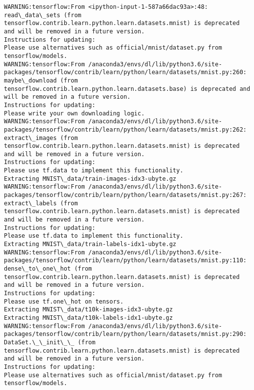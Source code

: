 \documentclass[11pt]{article}
\begin{document}
    \begin{Verbatim}[commandchars=\\\{\}]
WARNING:tensorflow:From <ipython-input-1-587a66dac93a>:48: read\_data\_sets (from tensorflow.contrib.learn.python.learn.datasets.mnist) is deprecated and will be removed in a future version.
Instructions for updating:
Please use alternatives such as official/mnist/dataset.py from tensorflow/models.
WARNING:tensorflow:From /anaconda3/envs/dl/lib/python3.6/site-packages/tensorflow/contrib/learn/python/learn/datasets/mnist.py:260: maybe\_download (from tensorflow.contrib.learn.python.learn.datasets.base) is deprecated and will be removed in a future version.
Instructions for updating:
Please write your own downloading logic.
WARNING:tensorflow:From /anaconda3/envs/dl/lib/python3.6/site-packages/tensorflow/contrib/learn/python/learn/datasets/mnist.py:262: extract\_images (from tensorflow.contrib.learn.python.learn.datasets.mnist) is deprecated and will be removed in a future version.
Instructions for updating:
Please use tf.data to implement this functionality.
Extracting MNIST\_data/train-images-idx3-ubyte.gz
WARNING:tensorflow:From /anaconda3/envs/dl/lib/python3.6/site-packages/tensorflow/contrib/learn/python/learn/datasets/mnist.py:267: extract\_labels (from tensorflow.contrib.learn.python.learn.datasets.mnist) is deprecated and will be removed in a future version.
Instructions for updating:
Please use tf.data to implement this functionality.
Extracting MNIST\_data/train-labels-idx1-ubyte.gz
WARNING:tensorflow:From /anaconda3/envs/dl/lib/python3.6/site-packages/tensorflow/contrib/learn/python/learn/datasets/mnist.py:110: dense\_to\_one\_hot (from tensorflow.contrib.learn.python.learn.datasets.mnist) is deprecated and will be removed in a future version.
Instructions for updating:
Please use tf.one\_hot on tensors.
Extracting MNIST\_data/t10k-images-idx3-ubyte.gz
Extracting MNIST\_data/t10k-labels-idx1-ubyte.gz
WARNING:tensorflow:From /anaconda3/envs/dl/lib/python3.6/site-packages/tensorflow/contrib/learn/python/learn/datasets/mnist.py:290: DataSet.\_\_init\_\_ (from tensorflow.contrib.learn.python.learn.datasets.mnist) is deprecated and will be removed in a future version.
Instructions for updating:
Please use alternatives such as official/mnist/dataset.py from tensorflow/models.

    \end{Verbatim}
\end{document}
